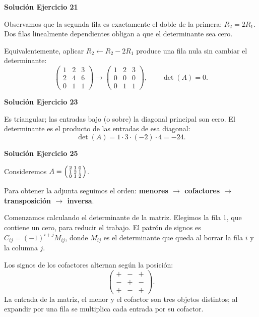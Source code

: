 \documentclass[12pt]{article}
\theoremstyle{remark}
\begin{document}
\par\bigskip\noindent\textbf{Solución Ejercicio 21}\par\nobreak
Observamos que la segunda fila es exactamente el doble de la primera: $R_2=2R_1$. Dos filas linealmente dependientes obligan a que el determinante sea cero.

Equivalentemente, aplicar $R_2\leftarrow R_2-2R_1$ produce una fila nula sin cambiar el determinante:
\[
\begin{pmatrix}1&2&3\\2&4&6\\0&1&1\end{pmatrix}\longrightarrow\begin{pmatrix}1&2&3\\0&0&0\\0&1&1\end{pmatrix},\qquad \boxed{\det(A)=0}.
\]

\par\bigskip\noindent\textbf{Solución Ejercicio 23}\par\nobreak
Es triangular; las entradas bajo (o sobre) la diagonal principal son cero. El determinante es el producto de las entradas de esa diagonal:
\[
\det(A)=1\cdot 3\cdot (-2)\cdot 4=-24.
\]

\par\bigskip\noindent\textbf{Solución Ejercicio 25}\par\nobreak
Consideremos $A=\begin{psmallmatrix}2&1&0\\1&2&1\\0&1&2\end{psmallmatrix}$.

Para obtener la adjunta seguimos el orden: \textbf{menores $\to$ cofactores $\to$ transposición $\to$ inversa}.

Comenzamos calculando el determinante de la matriz.
Elegimos la fila 1, que contiene un cero, para reducir el trabajo. El patrón de signos es $C_{ij}=(-1)^{i+j}M_{ij}$, donde $M_{ij}$ es el determinante que queda al borrar la fila $i$ y la columna $j$.

Los signos de los cofactores alternan según la posición:
\[
\begin{pmatrix}
+&-&+\\
-&+&-\\
+&-&+
\end{pmatrix}.
\]
La entrada de la matriz, el menor y el cofactor son tres objetos distintos; al expandir por una fila se multiplica cada entrada por su cofactor.
\end{document}
